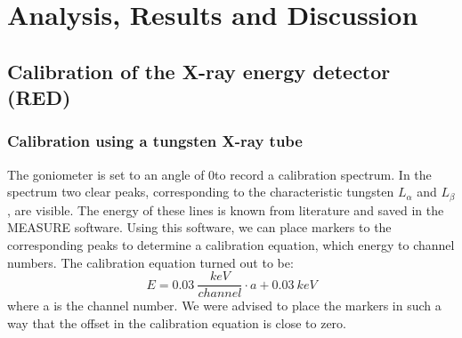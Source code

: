 \chapter{Analysis, Results and Discussion}
\section{Calibration of the X-ray energy detector (RED)}
\subsection{Calibration using a tungsten X-ray tube}
The goniometer is set to an angle of 0\degree to record a calibration spectrum. In the spectrum two clear peaks, corresponding to the characteristic tungsten $L_\alpha$ and $L_\beta$, are visible. The energy of these lines is known from literature and saved in the MEASURE software. Using this software, we can place markers to the corresponding peaks to determine a calibration equation, which energy to channel numbers. The calibration equation turned out to be: $$E = \SI{0.03}{\frac{keV}{channel}} \cdot a + \SI{0.03}{keV}$$
where a is the channel number. 
We were advised to place the markers in such a way that the offset in the calibration equation is close to zero.

